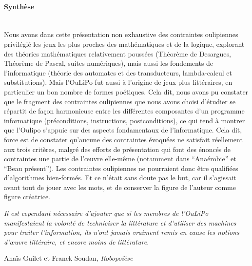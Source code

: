 \documentclass{article}
\newcommand{\subsubsubsection}[1]{\paragraph{#1}\mbox{}\\}
\newenvironment{citationbox}
{\begin{center}
		\begin{minipage}{.8\textwidth}
		}
		{
		\end{minipage}	
\end{center}
}
\begin{document}
				
				
				
				\subsubsubsection{Synthèse}
					Nous avons dans cette présentation non exhaustive des contraintes oulipiennes privilégié les jeux les plus proches des mathématiques et de la logique, explorant des théories mathématiques relativement poussées (Théorème de Desargues, Théorème de Pascal, suites numériques), mais aussi les fondements de l'informatique (théorie des automates et des transducteurs, lambda-calcul et substitutions). Mais l'OuLiPo fut aussi à l'origine de jeux plus littéraires, en particulier un bon nombre de formes poétiques. Cela dit, nous avons pu constater que le fragment des contraintes oulipiennes que nous avons choisi d'étudier se répartit de façon harmonieuse entre les différentes composantes d'un programme informatique (préconditions, instructions, postconditions), ce qui tend à montrer que l'Oulipo s'appuie sur des aspects fondamentaux de l'informatique. Cela dit, force est de constater qu'aucune des contraintes évoquées ne satisfait réellement aux trois critères, malgré des efforts de présentation qui font des énoncés de contraintes une partie de l'œuvre elle-même (notamment dans ``Anaérobie'' et ``Beau présent''). Les contraintes oulipiennes ne pourraient donc être qualifiées d'algorithmes bien-formés. Et ce n'était sans doute pas le but, car il s'agissait avant tout de jouer avec les mots, et de conserver la figure de l'auteur comme figure créatrice.
				
					\begin{citationbox}
						\textit{Il est cependant nécessaire d'ajouter que si les membres de l'OuLiPo manifestaient la volonté de techniciser la littérature et d'utiliser des machines pour traiter l‘information, ils n'ont jamais vraiment remis en cause les notions d'œuvre littéraire, et encore moins de littérature.}
						\begin{flushright}
							Anaïs Guilet et Franck Soudan, \textit{Robopoïèse}\cite{guilet2017}
						\end{flushright}
					\end{citationbox}
					
\end{document}
